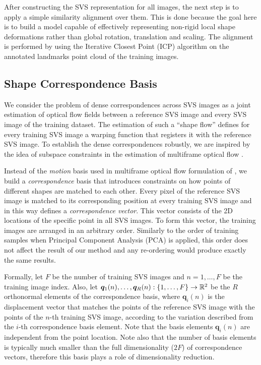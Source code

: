 After constructing the SVS representation for all images, the next step is to apply a simple similarity alignment over them. This is done because the goal here is to build a model capable of effectively representing non-rigid local shape deformations rather than global rotation, translation and scaling. The alignment is performed by using the Iterative Closest Point (ICP) algorithm \cite{Besl1992} on the annotated landmarks point cloud of the training images.


\subsection{Shape Correspondence Basis}

We consider the problem of dense correspondences across SVS images as a joint estimation of optical flow fields between a reference SVS image and every SVS image of the training dataset. The estimation of such a ``shape flow'' defines for every training SVS image a warping function that registers it with the reference SVS image. To establish the dense correspondences robustly, we are inspired by the idea of subspace constraints in the estimation of multiframe optical flow \cite{Garg:2013hu}.

Instead of the \emph{motion} basis used in multiframe optical flow formulation of \cite{Garg:2013hu}, we build a \emph{correspondence} basis that introduces constraints on how points of different shapes are matched to each other. Every pixel of the reference SVS image is matched to its corresponding position at every training SVS image and in this way defines a \emph{correspondence vector}. This vector consists of the 2D locations of the specific point in all SVS images. To form this vector, the training images are arranged in an arbitrary order. Similarly to the order of training samples when Principal Component Analysis (PCA) is applied, this order does not affect the result of our method and any re-ordering would produce exactly the same results.


Formally, let $F$ be the number of training SVS images and $n=1,\ldots,F$ be the training image index. Also, let $\boldsymbol{q}_1(n),\ldots,\boldsymbol{q}_R(n):
\{1,\ldots,F\} \rightarrow \mathbb{R}^2$ be the $R$ orthonormal elements of the correspondence basis, where $\boldsymbol{q}_i(n)$ is the displacement vector that matches the points of the reference SVS image with the points of the $n$-th training SVS image, according to the variation described from the $i$-th correspondence basis element. Note that the basis elements $\boldsymbol{q}_i(n)$ are independent from the point location. Note also that the number of basis elements is typically much smaller than the full dimensionality ($2 F$) of correspondence vectors, therefore this basis plays a role of dimensionality reduction.


